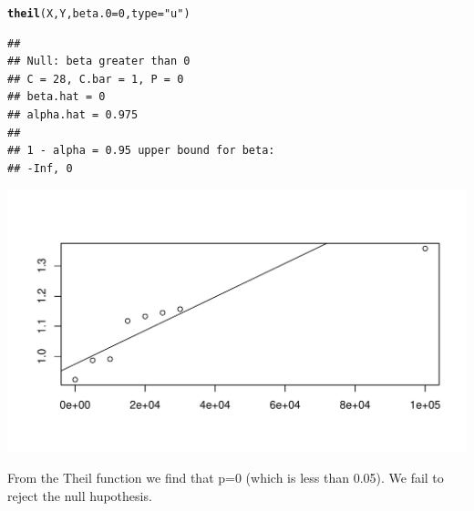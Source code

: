 \documentclass[a4paper]{article}\usepackage[]{graphicx}\usepackage[]{color}
\makeatletter
\def\maxwidth{ %
  \ifdim\Gin@nat@width>\linewidth
    \linewidth
  \else
    \Gin@nat@width
  \fi
}
\newcommand{\hlnum}[1]{\textcolor[rgb]{0.686,0.059,0.569}{#1}}%
\newcommand{\hlstr}[1]{\textcolor[rgb]{0.192,0.494,0.8}{#1}}%
\newcommand{\hlstd}[1]{\textcolor[rgb]{0.345,0.345,0.345}{#1}}%
\newcommand{\hlkwc}[1]{\textcolor[rgb]{0.333,0.667,0.333}{#1}}%
\newcommand{\hlkwd}[1]{\textcolor[rgb]{0.737,0.353,0.396}{\textbf{#1}}}%
\newenvironment{kframe}{%
 \def\at@end@of@kframe{}%
 \ifinner\ifhmode%
  \def\at@end@of@kframe{\end{minipage}}%
  \begin{minipage}{\columnwidth}%
 \fi\fi%
 \def\FrameCommand##1{\hskip\@totalleftmargin \hskip-\fboxsep
 \colorbox{shadecolor}{##1}\hskip-\fboxsep
     \hskip-\linewidth \hskip-\@totalleftmargin \hskip\columnwidth}%
 \MakeFramed {\advance\hsize-\width
   \@totalleftmargin\z@ \linewidth\hsize
   \@setminipage}}%
 {\par\unskip\endMakeFramed%
 \at@end@of@kframe}
\newenvironment{knitrout}{}{} %
\makeatother
\begin{document}
\begin{knitrout}
\begin{kframe}
{\ttfamily\noindent\itshape\color{messagecolor}{\#\# Loading required package: combinat\\\#\# \\\#\# Attaching package: 'combinat'\\\#\# \\\#\# The following object is masked from 'package:utils':\\\#\# \\\#\#\ \ \ \  combn\\\#\# \\\#\# Loading required package: MASS\\\#\# Loading required package: partitions\\\#\# Loading required package: survival\\\#\# Loading required package: splines\\\#\# fANCOVA 0.5-1 loaded}}\begin{alltt}
\hlkwd{theil}\hlstd{(X, Y,} \hlkwc{beta.0}\hlstd{=}\hlnum{0}\hlstd{,} \hlkwc{type}\hlstd{=}\hlstr{"u"}\hlstd{)}
\end{alltt}
\begin{verbatim}
## 
## Null: beta greater than 0
## C = 28, C.bar = 1, P = 0
## beta.hat = 0
## alpha.hat = 0.975
## 
## 1 - alpha = 0.95 upper bound for beta:
## -Inf, 0
\end{verbatim}
\end{kframe}
\includegraphics[width=\maxwidth]{figure/unnamed-chunk-1-1} 

\end{knitrout}
\raggedright{From the Theil function we find that p=0 (which is less than 0.05). We fail to reject the null hupothesis.}\\


\vspace{2 mm}
\end{document}
